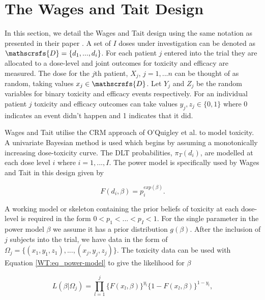 \section{The Wages and Tait Design}
\label{WT:Wages-and-Tait-Design}

In this section, we detail the Wages and Tait design using the same notation as presented in their paper \cite{wagesSeamlessPhaseII2015}. A set of $I$ doses under investigation can be denoted as $\mathscrsfs{D} = \{d_1, ...,d_i\}$. For each patient $j$ entered into the trial they are allocated to a dose-level and joint outcomes for toxicity and efficacy are measured. The dose for the $j$th patient, $X_j$, $j = 1,...n$ can be thought of as random, taking values $x_j \in  \mathscrsfs{D}$. Let $Y_j$ and $Z_j$ be the random variables for binary toxicity and efficacy events respectively. For an individual patient $j$ toxicity and efficacy outcomes can take values $y_j, z_j \in \{0,1\}$ where 0 indicates an event didn't happen and 1 indicates that it did. 

Wages and Tait \cite{wagesSeamlessPhaseII2015} utilise the CRM approach of O'Quigley et al. \cite{oquigleyContinualReassessmentMethod1990} to model toxicity. A univariate Bayesian method is used which begins by assuming a monotonically increasing dose-toxicity curve. The DLT probabilities, $\pi_T(d_i)$, are modelled at each dose level $i$ where $i= 1, ..., I$. The power model is specifically used by Wages and Tait in this design given by 

\begin{equation}
\label{WT:eq_power-model}
F(d_i, \beta) = p_i^{exp(\beta)}.
\end{equation}

A working model or skeleton containing the prior beliefs of toxicity at each dose-level is required in the form $0 < p_1 < ... <p_I <1$. For the single parameter in the power model $\beta$ we assume it has a prior distribution $g(\beta)$. After the inclusion of $j$ subjects into the trial, we have  data in the form of $\Omega_j = \{(x_1,y_1,z_1), ..., (x_j,y_j,z_j)\}$. The toxicity data can be used with Equation \ref{WT:eq_power-model} to give the likelihood for $\beta$

\begin{equation}
L(\beta|\Omega_j)=\prod_{l=1}^{j}\{F(x_l,\beta)\}^{y_l}\{1-F(x_l,\beta)\}^{1-y_l},  
\end{equation}

